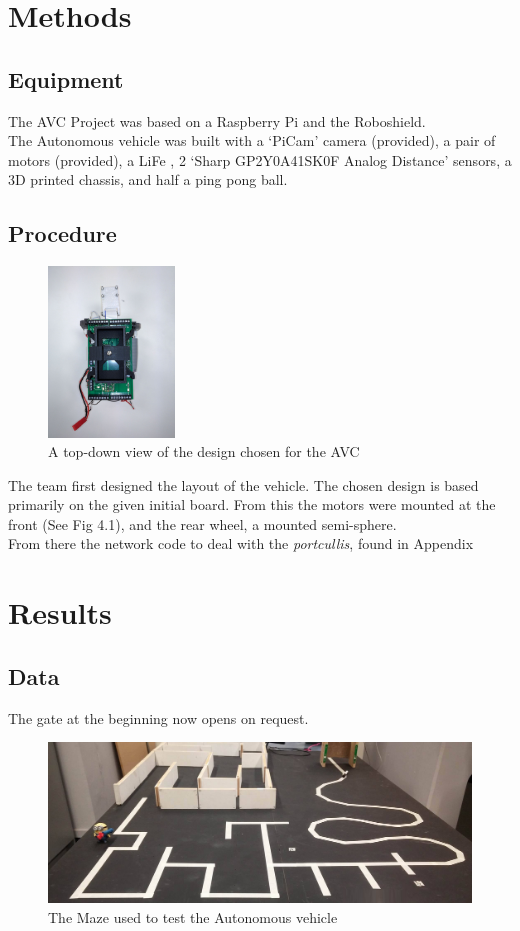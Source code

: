 \documentclass[paper=a4, fontsize=11pt]{scrartcl} %
\numberwithin{equation}{section} %
\numberwithin{figure}{section} %
\begin{document}
\section{Methods}
\subsection{Equipment}
The AVC Project was based on a Raspberry Pi and the Roboshield.\\
The Autonomous vehicle was built with a `PiCam' camera (provided), a pair of
motors (provided), a LiFe , 2 `Sharp GP2Y0A41SK0F Analog Distance' sensors, a 3D printed
chassis, and half a ping pong ball.
\subsection{Procedure}
\begin{figure}
  \begin{center}
    \includegraphics[width=0.3\textwidth]{top-down-view}
    \caption{A top-down view of the design chosen for the AVC}
  \end{center}
\end{figure}
The team first designed the layout of the vehicle. The chosen design is based
primarily on the given initial board. From this the motors were mounted at the
front (See Fig 4.1), and the rear wheel, a mounted semi-sphere.\\
From there the network code to deal with the \textit{portcullis}, found in
Appendix %


\section{Results}
\subsection{Data}
The gate at the beginning now opens on request.
\begin{figure}[h]
  \includegraphics[width=\textwidth]{maze}
  \centering
  \caption{The Maze used to test the Autonomous vehicle}
\end{figure}
\end{document}
